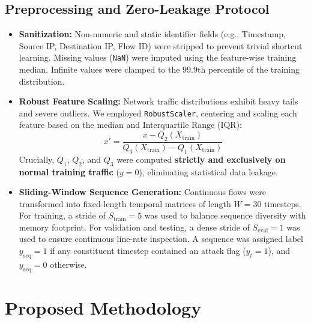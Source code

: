 \documentclass[twocolumn]{article}
\begin{document}
\subsection{Preprocessing and Zero-Leakage Protocol}
\begin{itemize}
    \item \textbf{Sanitization:} Non-numeric and static identifier fields (e.g., Timestamp, Source IP, Destination IP, Flow ID) were stripped to prevent trivial shortcut learning. Missing values (\texttt{NaN}) were imputed using the feature-wise training median. Infinite values were clamped to the 99.9th percentile of the training distribution.
    \item \textbf{Robust Feature Scaling:} Network traffic distributions exhibit heavy tails and severe outliers. We employed \texttt{RobustScaler}, centering and scaling each feature based on the median and Interquartile Range (IQR):
    \begin{equation}
        x' = \frac{x - Q_2(X_{\text{train}})}{Q_3(X_{\text{train}}) - Q_1(X_{\text{train}})}
    \end{equation}
    Crucially, $Q_1$, $Q_2$, and $Q_3$ were computed \textbf{strictly and exclusively on normal training traffic} ($y=0$), eliminating statistical data leakage.
    \item \textbf{Sliding-Window Sequence Generation:} Continuous flows were transformed into fixed-length temporal matrices of length $W = 30$ timesteps. For training, a stride of $S_{\text{train}} = 5$ was used to balance sequence diversity with memory footprint. For validation and testing, a dense stride of $S_{\text{eval}} = 1$ was used to ensure continuous line-rate inspection. A sequence was assigned label $y_{\text{seq}} = 1$ if any constituent timestep contained an attack flag ($y_t = 1$), and $y_{\text{seq}} = 0$ otherwise.
\end{itemize}

\section{Proposed Methodology}
\end{document}
